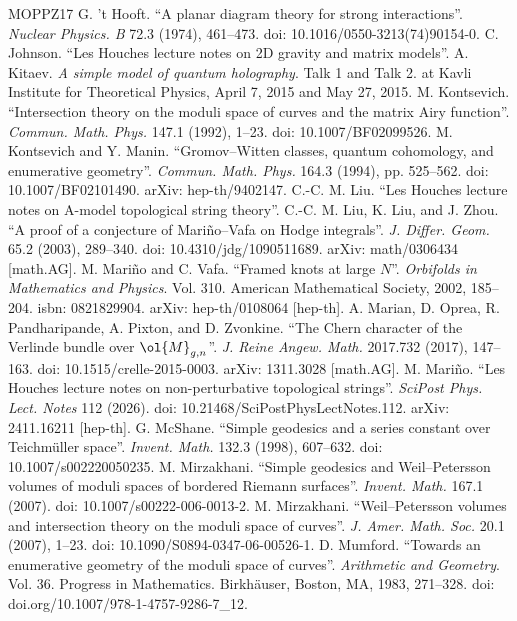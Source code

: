 \begin{thebibliography}{MOPPZ17}
 G. 't Hooft. ``A planar diagram theory for strong interactions''. \emph{Nuclear Physics. B} 72.3 (1974), 461--473. doi: 10.1016/0550-3213(74)90154-0.
 C. Johnson. ``Les Houches lecture notes on 2D gravity and matrix models''.
 A. Kitaev. \emph{A simple model of quantum holography}. Talk 1 and Talk 2. at Kavli Institute for Theoretical Physics, April 7, 2015 and May 27, 2015.
 M. Kontsevich. ``Intersection theory on the moduli space of curves and the matrix Airy function''. \emph{Commun. Math. Phys.} 147.1 (1992), 1--23. doi: 10.1007/BF02099526.
 M. Kontsevich and Y. Manin. ``Gromov--Witten classes, quantum cohomology, and enumerative geometry''. \emph{Commun. Math. Phys.} 164.3 (1994), pp. 525--562. doi: 10.1007/BF02101490. arXiv: hep-th/9402147.
 C.-C. M. Liu. ``Les Houches lecture notes on A-model topological string theory''.
 C.-C. M. Liu, K. Liu, and J. Zhou. ``A proof of a conjecture of Mari\~no--Vafa on Hodge integrals''. \emph{J. Differ. Geom.} 65.2 (2003), 289--340. doi: 10.4310/jdg/1090511689. arXiv: math/0306434 [math.AG].
 M. Mari\~no and C. Vafa. ``Framed knots at large $N$''. \emph{Orbifolds in Mathematics and Physics}. Vol. 310. American Mathematical Society, 2002, 185--204. isbn: 0821829904. arXiv: hep-th/0108064 [hep-th].
 A. Marian, D. Oprea, R. Pandharipande, A. Pixton, and D. Zvonkine. ``The Chern character of the Verlinde bundle over $\ol{M}_{g,n}$''. \emph{J. Reine Angew. Math.} 2017.732 (2017), 147--163. doi: 10.1515/crelle-2015-0003. arXiv: 1311.3028 [math.AG].
 M. Mari\~no. ``Les Houches lecture notes on non-perturbative topological strings''. \emph{SciPost Phys. Lect. Notes} 112 (2026). doi: 10.21468/SciPostPhysLectNotes.112. arXiv: 2411.16211 [hep-th].
 G. McShane. ``Simple geodesics and a series constant over Teichm\"uller space''. \emph{Invent. Math.} 132.3 (1998), 607--632. doi: 10.1007/s002220050235.
 M. Mirzakhani. ``Simple geodesics and Weil--Petersson volumes of moduli spaces of bordered Riemann surfaces''. \emph{Invent. Math.} 167.1 (2007). doi: 10.1007/s00222-006-0013-2.
 M. Mirzakhani. ``Weil--Petersson volumes and intersection theory on the moduli space of curves''. \emph{J. Amer. Math. Soc.} 20.1 (2007), 1--23. doi: 10.1090/S0894-0347-06-00526-1.
 D. Mumford. ``Towards an enumerative geometry of the moduli space of curves''. \emph{Arithmetic and Geometry}. Vol. 36. Progress in Mathematics. Birkh\"auser, Boston, MA, 1983, 271--328. doi: doi.org/10.1007/978-1-4757-9286-7\_12.

\end{thebibliography}
